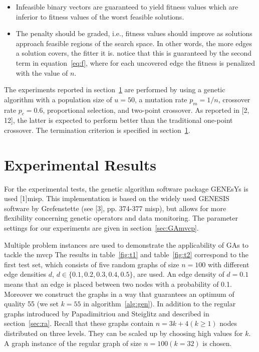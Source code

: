 \documentclass[12pt]{article}
\begin{document}
\begin{itemize}
\vspace{-3mm}

\item Infeasible binary vectors are guaranteed to yield fitness
values which are inferior to fitness values of
the worst feasible solutions.

\item The penalty should be graded, i.e., fitness values
should improve as solutions approach feasible regions
of the search space. In other words, the more edges a solution
covers, the fitter it is. notice that this is guaranteed by the
second term in equation~\ref{eq:f}, where for each uncovered edge
the fitness is penalized with the value of $n$.
\end{itemize}

The experiments reported in section~\ref{sec:er} are performed
by using a genetic algorithm with a population size of
$u = 50$, a mutation rate $p_m = 1/n$, crossover rate
$p_c = 0.6$, proportional selection, and two-point crossover.
As reported in [2, 12], the latter is expected to perform
better than the traditional one-point crossover.
The termination criterion is specified in section~\ref{sec:er}.


\section{Experimental Results}
\label{sec:er}
For the experimental tests,
the genetic algorithm software package GENEsYs is used [1]misp.
This implementation is based on the widely used GENESIS software by Grefenstette
(see [3], pp. 374-377 misp), but allows for more 
flexibility concerning genetic operators and data monitoring.
The parameter settings for our experiments are
given in section~\ref{sec:GAmvcp}.


Multiple problem instances are used to demonstrate the applicability of GAs to tackle the mvcp
The results in table~\ref{fig:t1}
and table~\ref{fig:t2} correspond to the first test set, which consists of
five random graphs of size $n = 100$ with different
edge densities $d$, $d \in \{0.1, 0.2, 0.3, 0.4, 0.5\}$, are used.
An edge density of $d = 0.1$ means that an edge is placed between two
nodes with a probability of 0.1.
Moreover we construct the graphs in a way that guarantees an optimum of quality 55
(we set $k = 55$ in algorithm~\ref{alg:gen}).
In addition to the regular graphs introduced by
Papadimitriou and Steiglitz and described in section~\ref{sec:ra}.
Recall that these graphs contain $n=3k+4 (k \geq 1)$ nodes distributed on three levels.
They can be scaled up by choosing high values for $k$.
A graph instance of the regular graph of size $n = 100 (k=32)$ is chosen.
\end{document}
